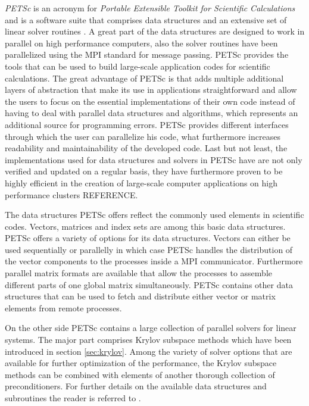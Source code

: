 \emph{PETSc} is an acronym for \emph{Portable Extensible Toolkit for Scientific Calculations} and is a software suite that comprises data structures and an extensive set of linear solver routines \cite{petsc-web-page,petsc-efficient}. A great part of the data structures are designed to work in parallel on high performance computers, also the solver routines have been parallelized using the MPI standard for message passing. PETSc provides the tools that can be used to build large-scale application codes for scientific calculations. The great advantage of PETSc is that adds multiple additional layers of abstraction that make its use in applications straightforward and allow the users to focus on the essential implementations of their own code instead of having to deal with parallel data structures and algorithms, which represents an additional source for programming errors. PETSc provides different interfaces through which the user can parallelize his code, what furthermore increases readability and maintainability of the developed code. Last but not least, the implementations used for data structures and solvers in PETSc have are not only verified and updated on a regular basis, they have furthermore proven to be highly efficient in the creation of large-scale computer applications on high performance clusters REFERENCE.

The data structures PETSc offers reflect the commonly used elements in scientific codes. Vectors, matrices and index sets are among this basic data structures. PETSc offers a variety of options for its data structures. Vectors can either be used sequentially or parallelly in which case PETSc handles the distribution of the vector components to the processes inside a MPI communicator. Furthermore parallel matrix formats are available that allow the processes to assemble different parts of one global matrix simultaneously. PETSc contains other data structures that can be used to fetch and distribute either vector or matrix elements from remote processes.

On the other side PETSc contains a large collection of parallel solvers for linear systems. The major part comprises Krylov subspace methods which have been introduced in section \ref{sec:krylov}. Among the variety of solver options that are available for further optimization of the performance, the Krylov subspace methods can be combined with elements of another thorough collection of preconditioners. For further details on the available data structures and subroutines the reader is referred to \cite{petsc-user-ref,petsc-web-page}.

